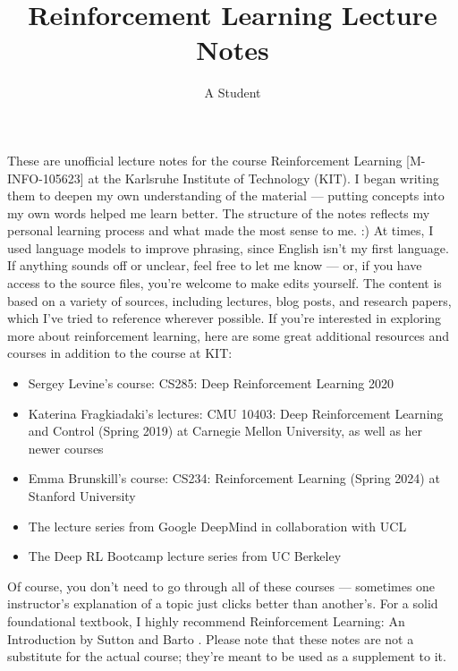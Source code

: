 \documentclass{article}
\title{Reinforcement Learning Lecture Notes}
\author{A Student}
\begin{document}
\maketitle
These are unofficial lecture notes for the course Reinforcement Learning [M-INFO-105623] at the Karlsruhe Institute of Technology 
(KIT). I began writing them to deepen my own understanding of the material — putting concepts into my own words helped 
me learn better. The structure of the notes reflects my personal learning process and what made the most sense to me. :)
At times, I used language models to improve phrasing, since English isn’t my first language. If anything sounds off or unclear, 
feel free to let me know — or, if you have access to the source files, you're welcome to make edits yourself.\newline
The content is based on a variety of sources, including lectures, blog posts, and research papers, which I’ve tried to reference 
wherever possible. If you're interested in exploring more about reinforcement learning, here are some great additional resources and courses in addition to the course at KIT:
\begin{itemize}
\item Sergey Levine’s course: CS285: Deep Reinforcement Learning 2020 \cite{CS285LevineYoutube,hafner2019learninglatentdynamicsplanning}
\item Katerina Fragkiadaki’s lectures: CMU 10403: Deep Reinforcement Learning and Control (Spring 2019) at Carnegie Mellon University, as well as her newer courses \cite{DeepRLandControl}
\item Emma Brunskill’s course: CS234: Reinforcement Learning (Spring 2024) at Stanford University \cite{CS234Stanford}
\item The lecture series from Google DeepMind in collaboration with UCL \cite{deepmind_ucl}
\item The Deep RL Bootcamp lecture series from UC Berkeley \cite{DeepRlBootcamp}
\end{itemize}
Of course, you don't need to go through all of these courses — sometimes one instructor's explanation of a topic just clicks 
better than another's. For a solid foundational textbook, I highly recommend Reinforcement Learning: An Introduction by Sutton 
and Barto \cite{10.5555/3312046}.
Please note that these notes are not a substitute for the actual course; they’re meant to be used as a supplement to it.
\newpage
\tableofcontents
\newpage






















%




\end{document}
